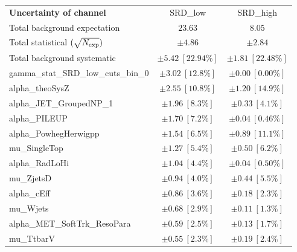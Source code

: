 
\begin{table}
\begin{center}
\setlength{\tabcolsep}{0.0pc}
\begin{tabular*}{\textwidth}{@{\extracolsep{\fill}}lcc}
\noalign{\smallskip}\hline\noalign{\smallskip}
{\bf Uncertainty of channel}                                    & SRD\_low            & SRD\_high            \\
\noalign{\smallskip}\hline\noalign{\smallskip}
Total background expectation             &  $23.63$        &  $8.05$       \\
\noalign{\smallskip}\hline\noalign{\smallskip}
Total statistical $(\sqrt{N_{\rm exp}})$              & $\pm 4.86$        & $\pm 2.84$       \\
Total background systematic               & $\pm 5.42\ [22.94\%] $        & $\pm 1.81\ [22.48\%] $             \\
\noalign{\smallskip}\hline\noalign{\smallskip}
\noalign{\smallskip}\hline\noalign{\smallskip}
gamma\_stat\_SRD\_low\_cuts\_bin\_0         & $\pm 3.02\ [12.8\%] $          & $\pm 0.00\ [0.00\%] $       \\
alpha\_theoSysZ         & $\pm 2.55\ [10.8\%] $          & $\pm 1.20\ [14.9\%] $       \\
alpha\_JET\_GroupedNP\_1         & $\pm 1.96\ [8.3\%] $          & $\pm 0.33\ [4.1\%] $       \\
alpha\_PILEUP         & $\pm 1.70\ [7.2\%] $          & $\pm 0.04\ [0.46\%] $       \\
alpha\_PowhegHerwigpp         & $\pm 1.54\ [6.5\%] $          & $\pm 0.89\ [11.1\%] $       \\
mu\_SingleTop         & $\pm 1.27\ [5.4\%] $          & $\pm 0.50\ [6.2\%] $       \\
alpha\_RadLoHi         & $\pm 1.04\ [4.4\%] $          & $\pm 0.04\ [0.50\%] $       \\
mu\_ZjetsD         & $\pm 0.94\ [4.0\%] $          & $\pm 0.44\ [5.5\%] $       \\
alpha\_cEff         & $\pm 0.86\ [3.6\%] $          & $\pm 0.18\ [2.3\%] $       \\
mu\_Wjets         & $\pm 0.68\ [2.9\%] $          & $\pm 0.11\ [1.3\%] $       \\
alpha\_MET\_SoftTrk\_ResoPara         & $\pm 0.59\ [2.5\%] $          & $\pm 0.13\ [1.7\%] $       \\
mu\_TtbarV         & $\pm 0.55\ [2.3\%] $          & $\pm 0.19\ [2.4\%] $       \\

\end{tabular*}
\end{center}
\end{table}
